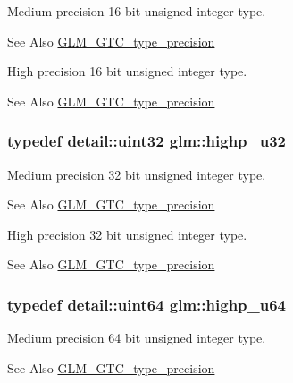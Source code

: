 Medium precision 16 bit unsigned integer type. \begin{DoxySeeAlso}{See Also}
\hyperlink{group__gtc__type__precision}{G\-L\-M\-\_\-\-G\-T\-C\-\_\-type\-\_\-precision}
\end{DoxySeeAlso}
High precision 16 bit unsigned integer type. \begin{DoxySeeAlso}{See Also}
\hyperlink{group__gtc__type__precision}{G\-L\-M\-\_\-\-G\-T\-C\-\_\-type\-\_\-precision} 
\end{DoxySeeAlso}
\hypertarget{group__gtc__type__precision_gae8e8a2c712653891a03c171795286ac5}{
\subsubsection[{highp\-\_\-u32}]{\setlength{\rightskip}{0pt plus 5cm}typedef detail\-::uint32 {\bf glm\-::highp\-\_\-u32}}}\label{group__gtc__type__precision_gae8e8a2c712653891a03c171795286ac5}
Medium precision 32 bit unsigned integer type. \begin{DoxySeeAlso}{See Also}
\hyperlink{group__gtc__type__precision}{G\-L\-M\-\_\-\-G\-T\-C\-\_\-type\-\_\-precision}
\end{DoxySeeAlso}
High precision 32 bit unsigned integer type. \begin{DoxySeeAlso}{See Also}
\hyperlink{group__gtc__type__precision}{G\-L\-M\-\_\-\-G\-T\-C\-\_\-type\-\_\-precision} 
\end{DoxySeeAlso}
\hypertarget{group__gtc__type__precision_ga6006ea883d3c0491791650b2fb84de39}{
\subsubsection[{highp\-\_\-u64}]{\setlength{\rightskip}{0pt plus 5cm}typedef detail\-::uint64 {\bf glm\-::highp\-\_\-u64}}}\label{group__gtc__type__precision_ga6006ea883d3c0491791650b2fb84de39}
Medium precision 64 bit unsigned integer type. \begin{DoxySeeAlso}{See Also}
\hyperlink{group__gtc__type__precision}{G\-L\-M\-\_\-\-G\-T\-C\-\_\-type\-\_\-precision}
\end{DoxySeeAlso}
